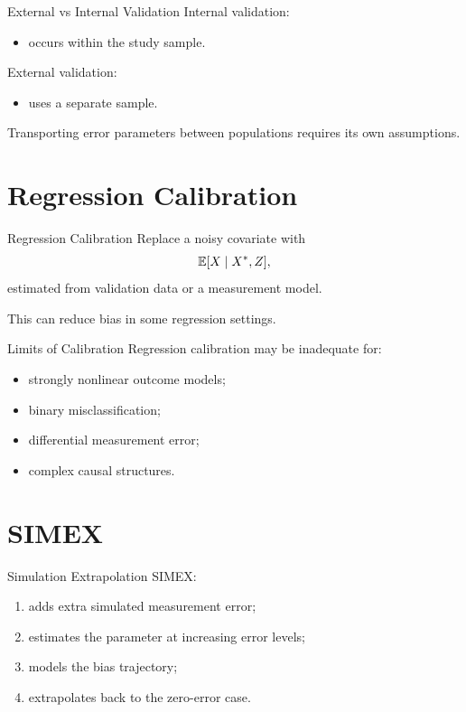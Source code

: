 \documentclass[aspectratio=169,11pt]{beamer}
\begin{document}
\begin{frame}{External vs Internal Validation}
Internal validation:
\begin{itemize}
\item occurs within the study sample.
\end{itemize}

External validation:
\begin{itemize}
\item uses a separate sample.
\end{itemize}

Transporting error parameters between populations requires its own assumptions.
\end{frame}

\section{Regression Calibration}

\begin{frame}{Regression Calibration}
Replace a noisy covariate with
\[
\mathbb{E}[X\mid X^\ast,Z],
\]
estimated from validation data or a measurement model.

This can reduce bias in some regression settings.
\end{frame}

\begin{frame}{Limits of Calibration}
Regression calibration may be inadequate for:
\begin{itemize}
\item strongly nonlinear outcome models;
\item binary misclassification;
\item differential measurement error;
\item complex causal structures.
\end{itemize}
\end{frame}

\section{SIMEX}

\begin{frame}{Simulation Extrapolation}
SIMEX:
\begin{enumerate}
\item adds extra simulated measurement error;
\item estimates the parameter at increasing error levels;
\item models the bias trajectory;
\item extrapolates back to the zero-error case.
\end{enumerate}
\end{frame}
\end{document}
